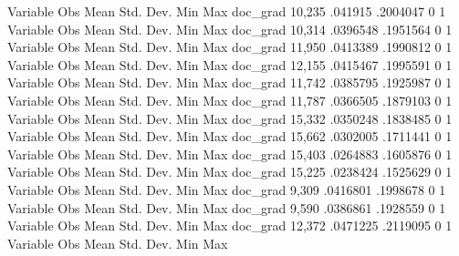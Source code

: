 {\smallskip}
    Variable {\VBAR}        Obs        Mean    Std. Dev.       Min        Max
    doc_grad {\VBAR}     10,235     .041915    .2004047          0          1
{\smallskip}
    Variable {\VBAR}        Obs        Mean    Std. Dev.       Min        Max
    doc_grad {\VBAR}     10,314    .0396548    .1951564          0          1
{\smallskip}
    Variable {\VBAR}        Obs        Mean    Std. Dev.       Min        Max
    doc_grad {\VBAR}     11,950    .0413389    .1990812          0          1
{\smallskip}
    Variable {\VBAR}        Obs        Mean    Std. Dev.       Min        Max
    doc_grad {\VBAR}     12,155    .0415467    .1995591          0          1
{\smallskip}
    Variable {\VBAR}        Obs        Mean    Std. Dev.       Min        Max
    doc_grad {\VBAR}     11,742    .0385795    .1925987          0          1
{\smallskip}
    Variable {\VBAR}        Obs        Mean    Std. Dev.       Min        Max
    doc_grad {\VBAR}     11,787    .0366505    .1879103          0          1
{\smallskip}
    Variable {\VBAR}        Obs        Mean    Std. Dev.       Min        Max
    doc_grad {\VBAR}     15,332    .0350248    .1838485          0          1
{\smallskip}
    Variable {\VBAR}        Obs        Mean    Std. Dev.       Min        Max
    doc_grad {\VBAR}     15,662    .0302005    .1711441          0          1
{\smallskip}
    Variable {\VBAR}        Obs        Mean    Std. Dev.       Min        Max
    doc_grad {\VBAR}     15,403    .0264883    .1605876          0          1
{\smallskip}
    Variable {\VBAR}        Obs        Mean    Std. Dev.       Min        Max
    doc_grad {\VBAR}     15,225    .0238424    .1525629          0          1
{\smallskip}
    Variable {\VBAR}        Obs        Mean    Std. Dev.       Min        Max
    doc_grad {\VBAR}      9,309    .0416801    .1998678          0          1
{\smallskip}
    Variable {\VBAR}        Obs        Mean    Std. Dev.       Min        Max
    doc_grad {\VBAR}      9,590    .0386861    .1928559          0          1
{\smallskip}
    Variable {\VBAR}        Obs        Mean    Std. Dev.       Min        Max
    doc_grad {\VBAR}     12,372    .0471225    .2119095          0          1
{\smallskip}
    Variable {\VBAR}        Obs        Mean    Std. Dev.       Min        Max
